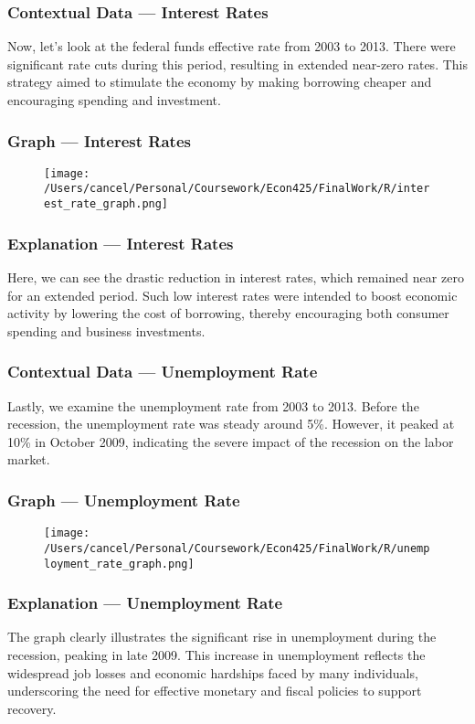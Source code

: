 \documentclass{beamer}
\begin{document}
\begin{frame}
    \frametitle{Contextual Data --- Interest Rates}
    Now, let's look at the federal funds effective rate from 2003 to 2013. There were significant rate cuts during this period, resulting in extended near-zero rates. This strategy aimed to stimulate the economy by making borrowing cheaper and encouraging spending and investment.
\end{frame}

\begin{frame}
    \frametitle{Graph --- Interest Rates}
    \begin{figure}[h!]
        \centering
        \texttt{[image: /Users/cancel/Personal/Coursework/Econ425/FinalWork/R/interest\_rate\_graph.png]}
    \end{figure}
\end{frame}

\begin{frame}
    \frametitle{Explanation --- Interest Rates}
    Here, we can see the drastic reduction in interest rates, which remained near zero for an extended period. Such low interest rates were intended to boost economic activity by lowering the cost of borrowing, thereby encouraging both consumer spending and business investments.
\end{frame}

\begin{frame}
    \frametitle{Contextual Data --- Unemployment Rate}
    Lastly, we examine the unemployment rate from 2003 to 2013. Before the recession, the unemployment rate was steady around 5\%. However, it peaked at 10\% in October 2009, indicating the severe impact of the recession on the labor market.
\end{frame}

\begin{frame}
    \frametitle{Graph --- Unemployment Rate}
    \begin{figure}[h!]
        \centering
        \texttt{[image: /Users/cancel/Personal/Coursework/Econ425/FinalWork/R/unemployment\_rate\_graph.png]}
    \end{figure}
\end{frame}

\begin{frame}
    \frametitle{Explanation --- Unemployment Rate}
    The graph clearly illustrates the significant rise in unemployment during the recession, peaking in late 2009. This increase in unemployment reflects the widespread job losses and economic hardships faced by many individuals, underscoring the need for effective monetary and fiscal policies to support recovery.
\end{frame}
\end{document}
